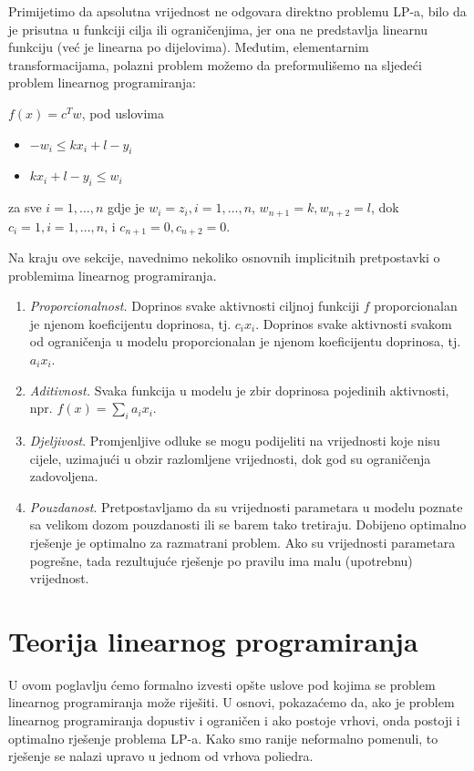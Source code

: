 \documentclass[a4paper, utf8, 11pt, colorlinks]{book}
\theoremstyle{definition}
\begin{document}
Primijetimo da apsolutna vrijednost ne odgovara direktno problemu LP-a, bilo da je prisutna u funkciji cilja ili ograničenjima, jer ona ne predstavlja linearnu funkciju (već je  linearna po dijelovima). Međutim, elementarnim transformacijama, polazni problem možemo da preformulišemo na sljedeći  problem linearnog programiranja: %

$f(x) = c^T w$, pod uslovima
\begin{itemize}
    \item $ -w_i \leq k x_i + l - y_i$ 
    \item $ k x_i + l - y_i \leq w_i $
\end{itemize}
za sve $i = 1, \ldots, n$ gdje je 
$w_i = z_i, i=1,\ldots,n$, $w_{n+1} = k, w_{n+2} = l$, dok 
$c_i = 1, i=1,\ldots,n$, i $c_{n+1} = 0, c_{n+2} = 0$. 


 
Na kraju ove sekcije, navednimo nekoliko osnovnih implicitnih pretpostavki o problemima linearnog programiranja. 
\begin{enumerate}
    \item \emph{Proporcionalnost.} Doprinos svake aktivnosti ciljnoj funkciji $f$ proporcionalan je njenom koeficijentu doprinosa, tj. $c_ix_i$. Doprinos svake aktivnosti svakom od  ograničenja u modelu proporcionalan je njenom  koeficijentu doprinosa, tj. $a_ix_i$.
    \item  \emph{Aditivnost.} Svaka funkcija u modelu je zbir  doprinosa pojedinih aktivnosti, npr. $f(x) = \sum_i a_i x_i$.
    \item \emph{Djeljivost}. Promjenljive odluke se mogu podijeliti na vrijednosti koje nisu cijele, uzimajući u obzir  razlomljene vrijednosti, dok god su ograničenja zadovoljena.  

    \item \emph{Pouzdanost}. Pretpostavljamo da su vrijednosti parametara u modelu poznate
    sa velikom dozom pouzdanosti ili se barem tako tretiraju. Dobijeno optimalno rješenje je optimalno za razmatrani problem. Ako su vrijednosti parametara pogrešne, tada rezultujuće rješenje po pravilu ima malu (upotrebnu)  vrijednost.  
\end{enumerate}

\section{Teorija linearnog programiranja}
U ovom poglavlju ćemo formalno izvesti opšte uslove pod kojima se problem linearnog programiranja može riješiti. U osnovi, pokazaćemo da, ako je problem
linearnog programiranja dopustiv i ograničen i ako postoje vrhovi, onda postoji i optimalno rješenje  problema LP-a. Kako smo ranije neformalno pomenuli,  to rješenje se nalazi upravo u jednom od vrhova poliedra.
\end{document}
